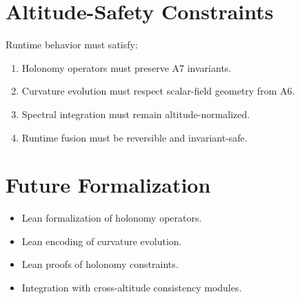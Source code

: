 \documentclass[12pt]{article}
\begin{document}
\section{Altitude-Safety Constraints}

\begin{definition}
Runtime behavior must satisfy:
\begin{enumerate}
    \item Holonomy operators must preserve A7 invariants.
    \item Curvature evolution must respect scalar-field geometry from A6.
    \item Spectral integration must remain altitude-normalized.
    \item Runtime fusion must be reversible and invariant-safe.
\end{enumerate}
\end{definition}

\section{Future Formalization}

\begin{itemize}
    \item Lean formalization of holonomy operators.
    \item Lean encoding of curvature evolution.
    \item Lean proofs of holonomy constraints.
    \item Integration with cross-altitude consistency modules.
\end{itemize}
\end{document}
